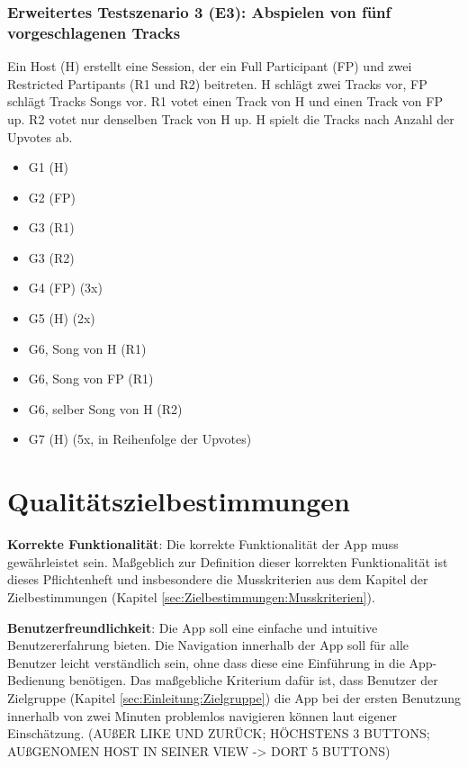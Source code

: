 \documentclass[oneside, ngerman]{sdqtechreport}
\begin{document}
\subsection{Erweitertes Testszenario 3 (E3): Abspielen von fünf vorgeschlagenen Tracks}
\label{subsec:Tests:ErweiterteTestszenarien:E3}
Ein Host (H) erstellt eine Session, der ein Full Participant (FP) und zwei Restricted Partipants (R1 und R2) beitreten. H schlägt zwei Tracks vor, FP schlägt Tracks Songs vor. R1 votet einen Track von H und einen Track von FP up. R2 votet nur denselben Track von H up. H spielt die Tracks nach Anzahl der Upvotes ab.
\begin{itemize}
    \item G1 (H)
    \item G2 (FP)
    \item G3 (R1)
    \item G3 (R2)
    \item G4 (FP) (3x)
    \item G5 (H) (2x)
    \item G6, Song von H (R1)
    \item G6, Song von FP (R1)
    \item G6, selber Song von H (R2)
    \item G7 (H) (5x, in Reihenfolge der Upvotes)
\end{itemize}


\chapter{Qualitätszielbestimmungen}
\label{chap:Qualitätszielbestimmungen}

\textbf{Korrekte Funktionalität}: Die korrekte Funktionalität der App muss gewährleistet sein. Maßgeblich zur Definition dieser korrekten Funktionalität ist dieses Pflichtenheft und insbesondere die Musskriterien aus dem Kapitel der Zielbestimmungen (Kapitel \ref{sec:Zielbestimmungen:Musskriterien}).

\textbf{Benutzerfreundlichkeit}: Die App soll eine einfache und intuitive Benutzererfahrung bieten. Die Navigation innerhalb der App soll für alle Benutzer leicht verständlich sein, ohne dass diese eine Einführung in die App-Bedienung benötigen. Das maßgebliche Kriterium dafür ist, dass Benutzer der Zielgruppe (Kapitel \ref{sec:Einleitung:Zielgruppe}) die App bei der ersten Benutzung innerhalb von zwei Minuten problemlos navigieren können laut eigener Einschätzung. (AUßER LIKE UND ZURÜCK; HÖCHSTENS 3 BUTTONS; AUßGENOMEN HOST IN SEINER VIEW -> DORT 5 BUTTONS)
\label{Qualitätszielbestimmungen_Benutzerfreundlichkeit}
\end{document}
